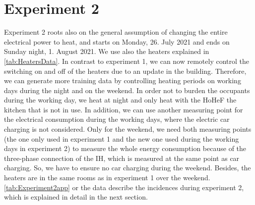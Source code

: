 \section{Experiment 2}
\label{sec:Experiment2}
Experiment 2 roots also on the general assumption of changing the entire electrical power to heat, and starts on Monday, 26. July 2021 and ends on Sunday night, 1. August 2021. We use also the heaters explained in \autoref{tab:HeatersData}. In contrast to experiment 1, we can now remotely control the switching on and off of the heaters due to an update in the building. Therefore, we can generate more training data by controlling heating periods on working days during the night and on the weekend. In order not to burden the occupants during the working day, we heat at night and only heat with the HoHeF the kitchen that is not in use. In addition, we can use another measuring point for the electrical consumption during the working days, where the electric car charging is not considered. Only for the weekend, we need both measuring points (the one only used in experiment 1 and the new one used during the working days in experiment 2) to measure the whole energy consumption because of the three-phase connection of the IH, which is measured at the same point as car charging. So, we have to ensure no car charging during the weekend. Besides, the heaters are in the same rooms as in experiment 1 over the weekend. \autoref{tab:Experiment2app} or the data describe the incidences during experiment 2, which is explained in detail in the next section. 

